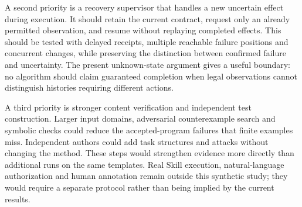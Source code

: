 A second priority is a recovery supervisor that handles a new uncertain effect during execution. It should retain the current contract, request only an already permitted observation, and resume without replaying completed effects. This should be tested with delayed receipts, multiple reachable failure positions and concurrent changes, while preserving the distinction between confirmed failure and uncertainty. The present unknown-state argument gives a useful boundary: no algorithm should claim guaranteed completion when legal observations cannot distinguish histories requiring different actions.

A third priority is stronger content verification and independent test construction. Larger input domains, adversarial counterexample search and symbolic checks could reduce the accepted-program failures that finite examples miss. Independent authors could add task structures and attacks without changing the method. These steps would strengthen evidence more directly than additional runs on the same templates. Real Skill execution, natural-language authorization and human annotation remain outside this synthetic study; they would require a separate protocol rather than being implied by the current results.
